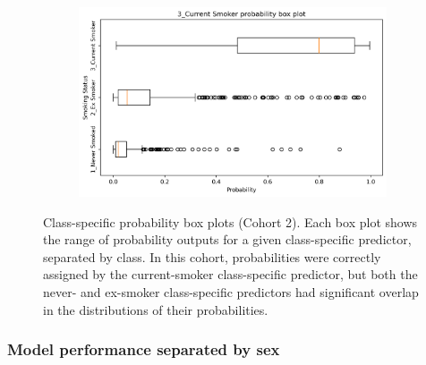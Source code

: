 \documentclass[draft]{article} %
\begin{document}
\begin{figure}[p]
\begin{subfigure}{0.75\linewidth}
    \end{subfigure}
    \begin{subfigure}{0.75\linewidth}
        \centering
        \includegraphics[width=\linewidth]{cohort2/test_boxplot_3.png}
    \end{subfigure}
    \caption[Class-specific probability box plots (Cohort 2)]{Class-specific probability box plots (Cohort 2). Each box plot shows the range of probability outputs for a given class-specific predictor, separated by class. In this cohort, probabilities were correctly assigned by the current-smoker class-specific predictor, but both the never- and ex-smoker class-specific predictors had significant overlap in the distributions of their probabilities.}
    \label{fig:cohort2-boxplots}
\end{figure}

\newpage
\subsubsection{Model performance separated by sex}
\end{document}

